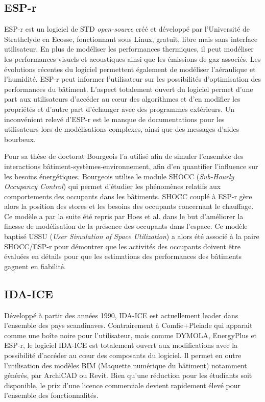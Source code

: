 \subsection*{ESP-r}

ESP-r est un logiciel de STD \textit{open-source} créé et développé par l'Université de Strathclyde en Ecosse, fonctionnant sous Linux, gratuit, libre mais sans interface utilisateur. En plus de modéliser les performances thermiques, il peut modéliser les performances visuels et acoustiques ainsi que les émissions de gaz associés. Les évolutions récentes du logiciel permettent également de modéliser l'aéraulique et l'humidité. ESP-r peut informer l'utilisateur sur les possibilités d'optimisation des performances du bâtiment. L'aspect totalement ouvert du logiciel permet d'une part aux utilisateurs d'accéder au cœur des algorithmes et d'en modifier les propriétés et d'autre part d'échanger avec des programmes extérieurs. Un inconvénient relevé d'ESP-r est le manque de documentations pour les utilisateurs lors de modélisations complexes, ainsi que des messages d'aides bourbeux.

Pour sa thèse de doctorat Bourgeois \cite{Bourgeois-05} l'a utilisé afin de simuler l'ensemble des interactions bâtiment-systèmes-environnement, afin d'en quantifier l'influence sur les besoins énergétiques. Bourgeois utilise le module SHOCC (\textit{Sub-Hourly Occupancy Control}) qui permet d'étudier les phénomènes relatifs aux comportements des occupants dans les bâtiments. SHOCC couplé à ESP-r gère alors la position des stores et les besoins des occupants concernant le chauffage. Ce modèle a par la suite été repris par Hoes et al. \cite{Hoes-09} dans le but d'améliorer la finesse de modélisation de la présence des occupants dans l'espace. Ce modèle baptisé USSU (\textit{User Simulation of Space Utilization}) a alors été associé à la paire SHOCC/ESP-r pour démontrer que les activités des occupants doivent être évaluées en détails pour que les estimations des performances des bâtiments gagnent en fiabilité.

\subsection*{IDA-ICE}

Développé à partir des années 1990, IDA-ICE est actuellement leader dans l'ensemble des pays scandinaves. Contrairement à Comfie+Pleiade qui apparait comme une boîte noire pour l'utilisateur, mais comme DYMOLA, EnergyPlus et ESP-r, le logiciel IDA-ICE est totalement ouvert aux modifications avec la possibilité d'accéder au cœur des composants du logiciel. Il permet en outre l'utilisation des modèles BIM (Maquette numérique du bâtiment) notamment générés, par ArchiCAD ou Revit. Bien qu'une réduction pour les étudiants soit disponible, le prix d'une licence commerciale devient rapidement élevé pour l'ensemble des fonctionnalités.

